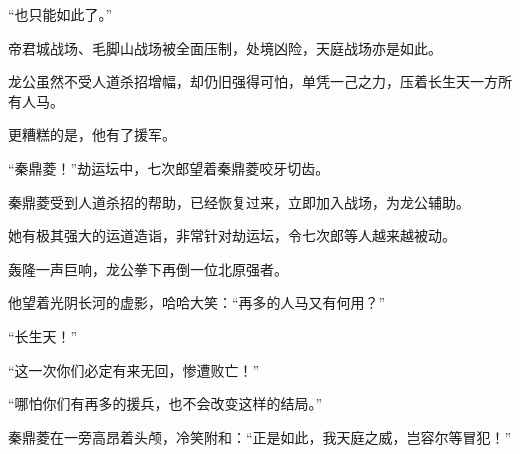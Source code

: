 \begin{this_body}
“也只能如此了。”

帝君城战场、毛脚山战场被全面压制，处境凶险，天庭战场亦是如此。

龙公虽然不受人道杀招增幅，却仍旧强得可怕，单凭一己之力，压着长生天一方所有人马。

更糟糕的是，他有了援军。

“秦鼎菱！”劫运坛中，七次郎望着秦鼎菱咬牙切齿。

秦鼎菱受到人道杀招的帮助，已经恢复过来，立即加入战场，为龙公辅助。

她有极其强大的运道造诣，非常针对劫运坛，令七次郎等人越来越被动。

轰隆一声巨响，龙公拳下再倒一位北原强者。

他望着光阴长河的虚影，哈哈大笑：“再多的人马又有何用？”

“长生天！”

“这一次你们必定有来无回，惨遭败亡！”

“哪怕你们有再多的援兵，也不会改变这样的结局。”

秦鼎菱在一旁高昂着头颅，冷笑附和：“正是如此，我天庭之威，岂容尔等冒犯！”

\end{this_body}

